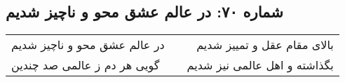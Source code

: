\begin{center}
\section*{شماره ۷۰: در عالم عشق محو و ناچیز شدیم}
\label{sec:070}
\begin{longtable}{l p{0.5cm} r}
در عالم عشق محو و ناچیز شدیم
&&
بالای مقام عقل و تمییز شدیم
\\
گویی هر دم ز عالمی صد چندین
&&
بگذاشته و اهل عالمی نیز شدیم
\\
\end{longtable}
\end{center}
